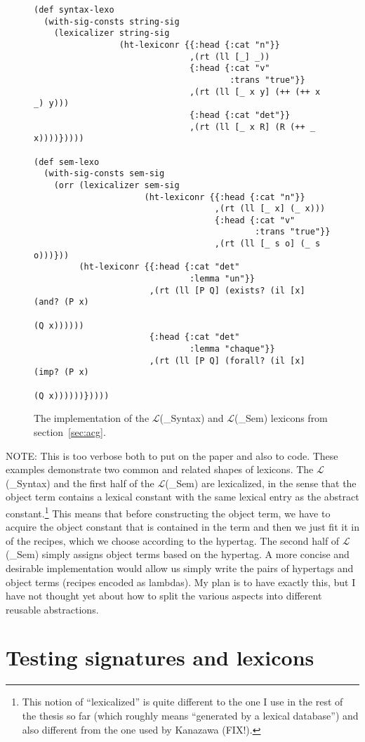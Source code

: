 \begin{figure}
  \centering
\begin{verbatim}
(def syntax-lexo
  (with-sig-consts string-sig
    (lexicalizer string-sig
                 (ht-lexiconr {{:head {:cat "n"}}
                               ,(rt (ll [_] _))
                               {:head {:cat "v"
                                       :trans "true"}}
                               ,(rt (ll [_ x y] (++ (++ x _) y)))
                               {:head {:cat "det"}}
                               ,(rt (ll [_ x R] (R (++ _ x))))}))))

(def sem-lexo
  (with-sig-consts sem-sig
    (orr (lexicalizer sem-sig
                      (ht-lexiconr {{:head {:cat "n"}}
                                    ,(rt (ll [_ x] (_ x)))
                                    {:head {:cat "v"
                                            :trans "true"}}
                                    ,(rt (ll [_ s o] (_ s o)))}))
         (ht-lexiconr {{:head {:cat "det"
                               :lemma "un"}}
                       ,(rt (ll [P Q] (exists? (il [x] (and? (P x)
                                                             (Q x))))))
                       {:head {:cat "det"
                               :lemma "chaque"}}
                       ,(rt (ll [P Q] (forall? (il [x] (imp? (P x)
                                                             (Q x))))))}))))
\end{verbatim}
  \caption{\label{fig:lex-impl} The implementation of the
    $\mathcal{L}$(\_{Syntax}) and $\mathcal{L}$(\_{Sem}) lexicons from
    section~\ref{sec:acg}.}
\end{figure}

 NOTE: This is too verbose both to put on the paper and also to
 code. These examples demonstrate two common and related shapes of
 lexicons. The $\mathcal{L}$(\_{Syntax}) and the first half of the
 $\mathcal{L}$(\_{Sem}) are lexicalized, in the sense that the object
 term contains a lexical constant with the same lexical entry as the
 abstract constant.\footnote{This notion of ``lexicalized'' is quite
   different to the one I use in the rest of the thesis so far (which
   roughly means ``generated by a lexical database'') and also different
   from the one used by Kanazawa (FIX!).} This means that before
 constructing the object term, we have to acquire the object constant
 that is contained in the term and then we just fit it in of the
 recipes, which we choose according to the hypertag. The second half of
 $\mathcal{L}$(\_{Sem}) simply assigns object terms based on the
 hypertag. A more concise and desirable implementation would allow us
 simply write the pairs of hypertags and object terms (recipes encoded
 as lambdas). My plan is to have exactly this, but I have not thought
 yet about how to split the various aspects into different reusable
 abstractions.

\section{Testing signatures and lexicons}
